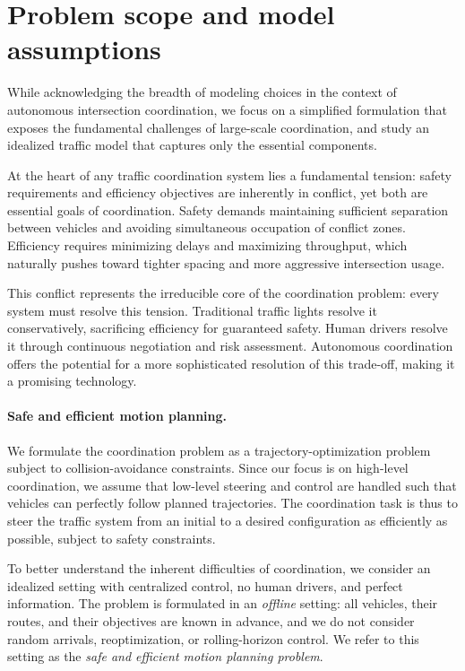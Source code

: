 \documentclass{report}
\theoremstyle{definition}
\theoremstyle{plain}
\begin{document}
\section{Problem scope and model assumptions}

While acknowledging the breadth of modeling choices in the context of autonomous
intersection coordination, we focus on a simplified formulation that exposes the
fundamental challenges of large-scale coordination, and study an idealized
traffic model that captures only the essential components.


At the heart of any traffic coordination system lies a fundamental tension:
safety requirements and efficiency objectives are inherently in conflict, yet
both are essential goals of coordination.
%
Safety demands maintaining sufficient separation between vehicles and avoiding
simultaneous occupation of conflict zones.
% 
Efficiency requires minimizing delays and maximizing throughput, which naturally
pushes toward tighter spacing and more aggressive intersection usage.


This conflict represents the irreducible core of the coordination problem: every
system must resolve this tension.
%
Traditional traffic lights resolve it conservatively, sacrificing efficiency for
guaranteed safety.
%
Human drivers resolve it through continuous negotiation and risk assessment.
Autonomous coordination offers the potential for a more sophisticated resolution
of this trade-off, making it a promising technology.

\paragraph{Safe and efficient motion planning.}

We formulate the coordination problem as a trajectory-optimization problem
subject to collision-avoidance constraints.
%
Since our focus is on high-level coordination, we assume that low-level steering
and control are handled such that vehicles can perfectly follow planned
trajectories.
%
The coordination task is thus to steer the traffic system from an initial to a
desired configuration as efficiently as possible, subject to safety constraints.
%

To better understand the inherent difficulties of coordination, we consider an
idealized setting with centralized control, no human drivers, and perfect
information. The problem is formulated in an \emph{offline} setting: all
vehicles, their routes, and their objectives are known in advance, and we do not
consider random arrivals, reoptimization, or rolling-horizon control.
%
We refer to this setting as the \emph{safe and efficient motion planning problem}.
\end{document}
